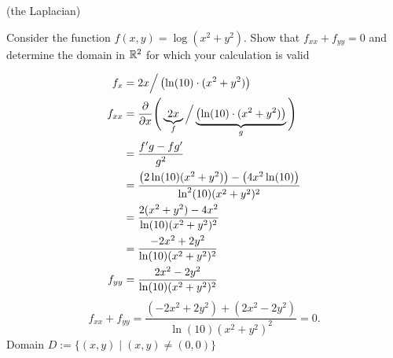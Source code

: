 (the Laplacian)

\nl Consider the function $f(x,y) = \log(x^2 + y^2)$. Show that $f_{xx} + f_{yy} = 0$ and determine the domain in $\mathbb{R}^2$ for which your calculation is valid 

\soln*

\begin{align*}
    f_{x} &= 2x \Big/ \pars{\ln(10) \cdot (x^2 + y^2) } \\
    f_{xx} &= \pdv{x}\Bigg( \underbrace{2x}_{f} \Big/ \underbrace{  \pars{\ln(10) \cdot (x^2 + y^2) }  }_{g}  \Bigg)
    \\ &= \frac{f'g - fg'}{g^2} \\
    &= \frac{ \pars{2\ln(10)(x^2 + y^2)} - \pars{4x^2 \ln(10)} }{\ln^2(10) (x^2 + y^2)^2  }\\
    &= \frac{ 2(x^2 + y^2) - 4x^2 }{\ln(10) (x^2 + y^2)^2  }\\
    &= \frac{-2x^2 + 2y^2}{\ln(10) (x^2+y^2)^2} \\
    f_{yy} &= \frac{2x^2 - 2y^2}{\ln(10) (x^2+y^2)^2}
\end{align*}
$$f_{xx} + f_{yy} = \frac{(-2x^2 + 2y^2) + (2x^2 - 2y^2)}{\ln(10) (x^2+y^2)^2} = 0.$$
Domain $D := \{(x,y) \mid (x,y) \neq (0,0)\}$